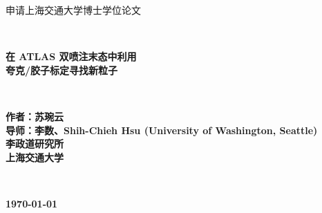 \documentclass[UTF8,12pt]{ctexart}
\numberwithin{equation}{section}
\def\[{\left[}
\begin{document}
	\begin{figure}[htb] 
	\end{figure}
	
	\begin{center}
		\songti {} 申请上海交通大学博士学位论文
	\end{center}
	~\\[0mm]
	\begin{center}
		\songti {} \textbf{在 ATLAS 双喷注末态中利用\\
			夸克/胶子标定寻找新粒子
		}
	\end{center}
	~\\

	\begin{center}
		\textbf{
			作者：苏琬云\\
			导师：李数、Shih-Chieh Hsu (University of Washington, Seattle)\\
			\vspace{6mm}
			李政道研究所\\
			上海交通大学}
		\end{center}
		~\\
		\begin{center}
			\songti {} \textbf{\today}
		\end{center}
		
\end{document}
